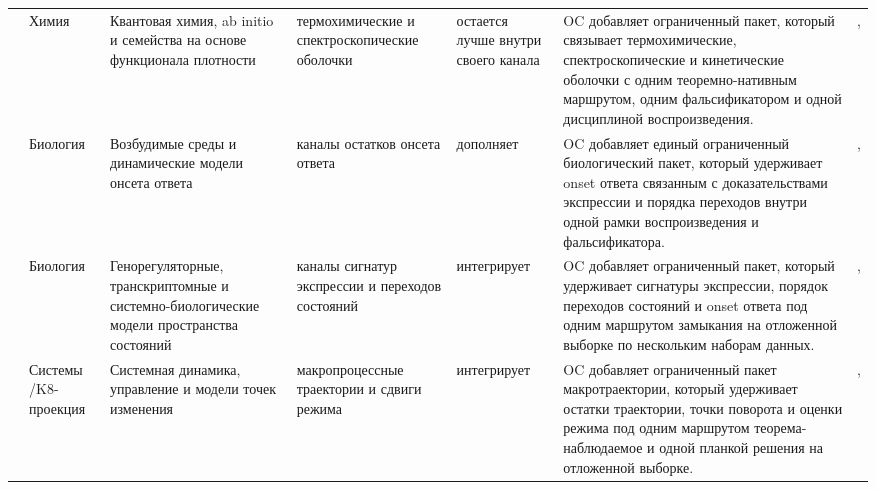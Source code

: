 \begin{longtable}{@{}L{0.14\textwidth}L{0.09\textwidth}L{0.14\textwidth}L{0.12\textwidth}L{0.10\textwidth}L{0.18\textwidth}L{0.15\textwidth}@{}}
 & Химия & Квантовая химия, ab initio и семейства на основе функционала плотности & термохимические и спектроскопические оболочки & остается лучше внутри своего канала & OC добавляет ограниченный пакет, который связывает термохимические, спектроскопические и кинетические оболочки с одним теоремно-нативным маршрутом, одним фальсификатором и одной дисциплиной воспроизведения. & , \allowbreak {} \\
 & Биология & Возбудимые среды и динамические модели онсета ответа & каналы остатков онсета ответа & дополняет & OC добавляет единый ограниченный биологический пакет, который удерживает onset ответа связанным с доказательствами экспрессии и порядка переходов внутри одной рамки воспроизведения и фальсификатора. & , \allowbreak {} \\
 & Биология & Генорегуляторные, транскриптомные и системно-биологические модели пространства состояний & каналы сигнатур экспрессии и переходов состояний & интегрирует & OC добавляет ограниченный пакет, который удерживает сигнатуры экспрессии, порядок переходов состояний и onset ответа под одним маршрутом замыкания на отложенной выборке по нескольким наборам данных. & , \allowbreak {} \\
 & Системы /\allowbreak K8-проекция & Системная динамика, управление и модели точек изменения & макропроцессные траектории и сдвиги режима & интегрирует & OC добавляет ограниченный пакет макротраектории, который удерживает остатки траектории, точки поворота и оценки режима под одним маршрутом теорема-наблюдаемое и одной планкой решения на отложенной выборке. & , \allowbreak {} \\

\end{longtable}
